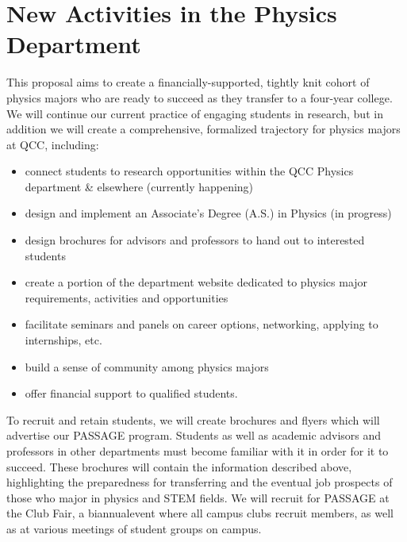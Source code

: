 \documentclass[12pt]{article}
\begin{document}
\section{New Activities in the Physics Department}
\vspace{-3mm}
This proposal aims to create a financially-supported, tightly knit cohort of physics majors who are ready to succeed as they transfer to a four-year college.  We will continue our current practice of engaging students in research, but in addition we will  create a comprehensive, formalized trajectory for physics majors at QCC, including:
\vspace{-2mm}

\begin{itemize}
\setlength{\itemsep}{-\parsep}
\setlength{\topsep}{-\parsep}
\setlength{\partopsep}{-\parsep}
	\item connect students to research opportunities within the QCC Physics department \& elsewhere (currently happening)
	\item design and implement an Associate's Degree (A.S.) in Physics (in progress)
	\item design brochures for advisors and professors to hand out to interested students
	\item create a portion of the department website dedicated to physics major requirements, activities and opportunities
	\item facilitate seminars and panels on career options, networking, applying to internships, etc.
	\item build a sense of community among physics majors 
	\item offer financial support to qualified students.	
\end{itemize}	
	\vspace{-1mm}
To recruit and retain students, we will create brochures and flyers which will advertise our PASSAGE program.  Students as well as academic advisors and professors in other departments must become familiar with it in order for it to succeed.  These brochures will contain the information described above, highlighting the preparedness for transferring and the eventual job prospects of those who major in physics and STEM fields.  We will recruit for PASSAGE at the Club Fair, a biannualevent where all campus clubs recruit members, as well as at various meetings of student groups on campus.
\end{document}
